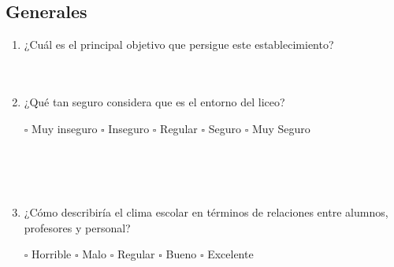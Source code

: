 \documentclass{article}
\begin{document}
\newpage
\subsection*{Generales}
\begin{enumerate}[leftmargin=*, label=\arabic*.]
    \item ¿Cuál es el principal objetivo que persigue este establecimiento?\\[0.5cm]
        \underline{\hspace{0.95\linewidth}} \vspace{0.3cm} \\
        \underline{\hspace{0.95\linewidth}} \vspace{0.3cm} \\
        \underline{\hspace{0.95\linewidth}} \vspace{0.3cm}

    \item ¿Qué tan seguro considera que es el entorno del liceo? 
        \begin{center}
            $\square$ Muy inseguro \hspace{0.7cm} $\square$ Inseguro \hspace{0.7cm} $\square$ Regular \hspace{0.7cm} $\square$ Seguro \hspace{0.7cm} $\square$ Muy Seguro
        \end{center}
        \underline{\hspace{0.95\linewidth}} \vspace{0.3cm} \\
        \underline{\hspace{0.95\linewidth}} \vspace{0.3cm} \\
        \underline{\hspace{0.95\linewidth}} \vspace{0.3cm} \\

    \item ¿Cómo describiría el clima escolar en términos de relaciones entre alumnos, profesores y personal? %
    \begin{center}
        $\square$ Horrible \hspace{0.7cm} $\square$ Malo \hspace{0.7cm} $\square$ Regular \hspace{0.7cm} $\square$ Bueno \hspace{0.7cm} $\square$ Excelente
    \end{center}
        \underline{\hspace{0.95\linewidth}} \vspace{0.3cm} \\
        \underline{\hspace{0.95\linewidth}} \vspace{0.3cm} \\
        \underline{\hspace{0.95\linewidth}} \vspace{0.3cm}
    

\end{enumerate}
\end{document}
